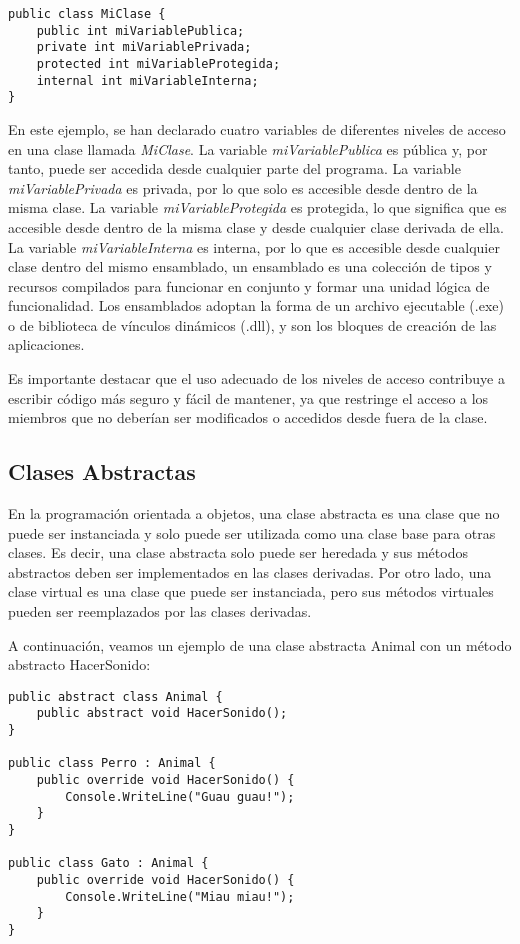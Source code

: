 \documentclass[executivepaper]{article}
\begin{document}
\begin{lstlisting}
public class MiClase {
    public int miVariablePublica;
    private int miVariablePrivada;
    protected int miVariableProtegida;
    internal int miVariableInterna;
}
\end{lstlisting}

En este ejemplo, se han declarado cuatro variables de diferentes niveles de acceso en una clase llamada \emph{MiClase}. La variable \emph{miVariablePublica} es pública y, por tanto, puede ser accedida desde cualquier parte del programa. La variable \emph{miVariablePrivada} es privada, por lo que solo es accesible desde dentro de la misma clase. La variable \emph{miVariableProtegida} es protegida, lo que significa que es accesible desde dentro de la misma clase y desde cualquier clase derivada de ella. La variable \emph{miVariableInterna} es interna, por lo que es accesible desde cualquier clase dentro del mismo ensamblado, un ensamblado es una colección de tipos y recursos compilados para funcionar en conjunto y formar una unidad lógica de funcionalidad. Los ensamblados adoptan la forma de un archivo ejecutable (.exe) o de biblioteca de vínculos dinámicos (.dll), y son los bloques de creación de las aplicaciones.

Es importante destacar que el uso adecuado de los niveles de acceso contribuye a escribir código más seguro y fácil de mantener, ya que restringe el acceso a los miembros que no deberían ser modificados o accedidos desde fuera de la clase.

\subsection{Clases Abstractas}

En la programación orientada a objetos, una clase abstracta es una clase que no puede ser instanciada y solo puede ser utilizada como una clase base para otras clases. Es decir, una clase abstracta solo puede ser heredada y sus métodos abstractos deben ser implementados en las clases derivadas. Por otro lado, una clase virtual es una clase que puede ser instanciada, pero sus métodos virtuales pueden ser reemplazados por las clases derivadas.

A continuación, veamos un ejemplo de una clase abstracta Animal con un método abstracto HacerSonido:

\begin{lstlisting}
public abstract class Animal {
    public abstract void HacerSonido();
}

public class Perro : Animal {
    public override void HacerSonido() {
        Console.WriteLine("Guau guau!");
    }
}

public class Gato : Animal {
    public override void HacerSonido() {
        Console.WriteLine("Miau miau!");
    }
}
\end{lstlisting}
\end{document}
